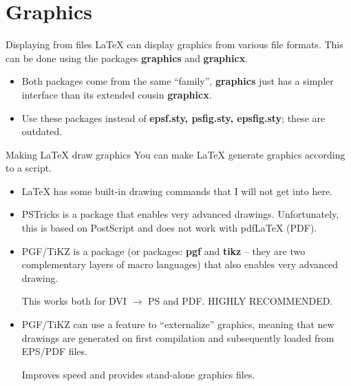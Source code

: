 \documentclass[english]{beamer}
\begin{document}

\section{Graphics}

\begin{frame}{\insertsection}{Displaying from files}
  \LaTeX{} can display graphics from various file formats. This can be
  done using the packages \textbf{graphics} and \textbf{graphicx}.
  \begin{itemize}
  \item Both packages come from the same ``family'', \textbf{graphics}
    just has a simpler interface than its extended cousin
    \textbf{graphicx}.
  \item Use these packages instead of \textbf{epsf.sty, psfig.sty,
      epsfig.sty}; these are outdated.
  \end{itemize}
\end{frame}

\begin{frame}{\insertsection}{Making \LaTeX{} draw graphics}
  You can make \LaTeX{} generate graphics according to a script.
  \begin{itemize}
  \item \LaTeX{} has some built-in drawing commands that I will not
    get into here.
  \item PSTricks is a package that enables very advanced
    drawings. Unfortunately, this is based on PostScript and does not
    work with pdfLaTeX (PDF).
  \item PGF/TiKZ is a package (or packages: \textbf{pgf} and
    \textbf{tikz} -- they are two complementary layers of macro
    languages) that also enables very advanced drawing.

    This works both for DVI $\rightarrow$ PS and PDF. HIGHLY RECOMMENDED.
  \item PGF/TiKZ can use a feature to ``externalize'' graphics,
    meaning that new drawings are generated on first compilation and
    subsequently loaded from EPS/PDF files.

    Improves speed and provides stand-alone graphics files.
  \end{itemize}
\end{frame}
\end{document}
